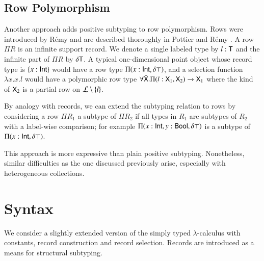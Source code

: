 \documentclass{report}
\begin{document}
  \section{Row Polymorphism}
  Another approach adds positive subtyping to row polymorphism. Rows were introduced
  by R\'emy \cite{projectiveml} and are described thoroughly in Pottier and R\'emy \cite{pottier-remy-emlti}.
  A row $\Pi R$ is an infinite support record.
  We denote a single labeled type by $l:\textsf{T}$ and the infinite part
  of $\Pi R$ by $\delta\textsf{T}$. A typical one-dimensional point object whose
  record type is $\left\{x:\textsf{Int}\right\}$ would have a row type $\Pi(x:\textsf{Int},\delta\top)$,
  and a selection function $\lambda x.x.l$ would have a polymorphic row type
  $\forall\bar{\textsf{X}}.\Pi(l:\textsf{X}_1,\textsf{X}_2)\rightarrow\textsf{X}_1$ where the kind
  of $\textsf{X}_2$ is a partial row on $\mathcal{L}\setminus\left\{l\right\}$.
  
  By analogy with records, we can extend the subtyping relation to rows
  by considering a row $\Pi R_1$ a subtype of $\Pi R_2$
  if all types in $R_1$ are subtypes of $R_2$ with a label-wise comparison;
  for example $\Pi(x:\textsf{Int},y:\textsf{Bool},\delta\top)$ is a subtype of $\Pi(x:\textsf{Int},\delta\top)$.
  
  This approach is more expressive than plain positive subtyping. Nonetheless, similar difficulties
  as the one discussed previously arise, especially with heterogeneous collections.
  
  \chapter{Syntax}
  We consider a slightly extended version of the simply typed $\lambda$-calculus with constants,
  record construction and record selection. Records are introduced as a means for structural subtyping.
    
\end{document}
